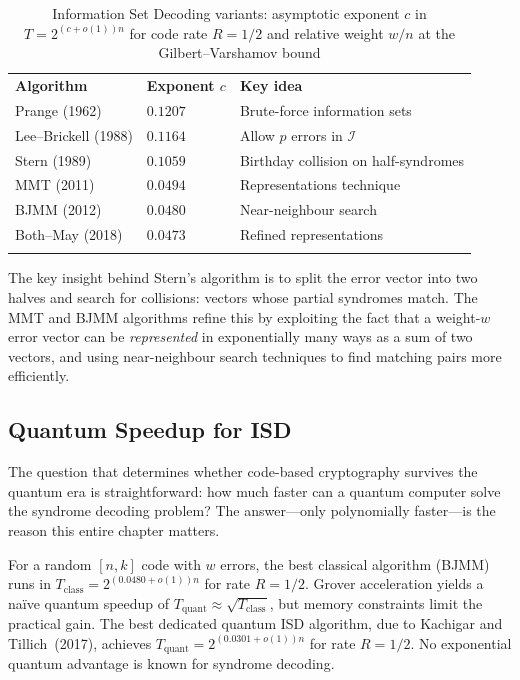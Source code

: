 \begin{table}[t]
\caption{Information Set Decoding variants: asymptotic exponent $c$ in $T = 2^{(c + o(1))n}$ for code rate $R = 1/2$ and relative weight $w/n$ at the Gilbert--Varshamov bound}
\label{tab:isd-variants}
\begin{tabular}{p{4.5cm}p{3cm}p{4.5cm}}
\hline\noalign{\smallskip}
\textbf{Algorithm} & \textbf{Exponent $c$} & \textbf{Key idea} \\
\noalign{\smallskip}\svhline\noalign{\smallskip}
Prange (1962) & $0.1207$ & Brute-force information sets \\
Lee--Brickell (1988) & $0.1164$ & Allow $p$ errors in $\mathcal{I}$ \\
Stern (1989) & $0.1059$ & Birthday collision on half-syndromes \\
MMT (2011) & $0.0494$ & Representations technique \\
BJMM (2012) & $0.0480$ & Near-neighbour search \\
Both--May (2018) & $0.0473$ & Refined representations \\
\noalign{\smallskip}\hline
\end{tabular}
\end{table}

The key insight behind Stern's algorithm is to split the error vector into two halves and search for collisions: vectors whose partial syndromes match.  The MMT and BJMM algorithms refine this by exploiting the fact that a weight-$w$ error vector can be \emph{represented} in exponentially many ways as a sum of two vectors, and using near-neighbour search techniques to find matching pairs more efficiently.


\subsection{Quantum Speedup for ISD}
\label{subsec:quantum-isd}

The question that determines whether code-based cryptography survives the quantum era is straightforward: how much faster can a quantum computer solve the syndrome decoding problem?  The answer---only polynomially faster---is the reason this entire chapter matters.

\begin{theorem}
\label{thm:quantum-isd}
For a random $[n, k]$ code with $w$ errors, the best classical algorithm (BJMM) runs in $T_{\mathrm{class}} = 2^{(0.0480 + o(1))n}$ for rate $R = 1/2$.  Grover acceleration yields a na\"ive quantum speedup of $T_{\mathrm{quant}} \approx \sqrt{T_{\mathrm{class}}}$, but memory constraints limit the practical gain.  The best dedicated quantum ISD algorithm, due to Kachigar and Tillich~(2017), achieves $T_{\mathrm{quant}} = 2^{(0.0301 + o(1))n}$ for rate $R = 1/2$.  No exponential quantum advantage is known for syndrome decoding.
\end{theorem}

